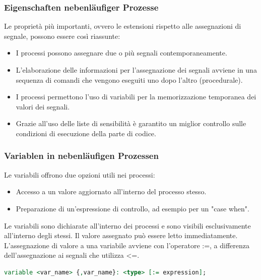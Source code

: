         \subsubsection{Eigenschaften nebenläufiger Prozesse}
        Le proprietà più importanti, ovvero le estensioni rispetto alle assegnazioni di segnale, possono essere così riassunte:
            \begin{itemize}
                \item I processi possono assegnare due o più segnali contemporaneamente.
                \item L'elaborazione delle informazioni per l'assegnazione dei segnali avviene in una sequenza di comandi che vengono eseguiti uno dopo l'altro (procedurale).
                \item I processi permettono l'uso di variabili per la memorizzazione temporanea dei valori dei segnali.
                \item Grazie all'uso delle liste di sensibilità è garantito un miglior controllo sulle condizioni di esecuzione della parte di codice.
            \end{itemize}
    
        \subsubsection{Variablen in nebenläufigen Prozessen}
        Le variabili offrono due opzioni utili nei processi:
            \begin{itemize}
                \item Accesso a un valore aggiornato all'interno del processo stesso.
                \item Preparazione di un'espressione di controllo, ad esempio per un "case when".
            \end{itemize}
            Le variabili sono dichiarate all'interno dei processi e sono visibili esclusivamente all'interno degli stessi.
            Il valore assegnato può essere letto immediatamente.\\
            L'assegnazione di valore a una variabile avviene con l'operatore :=, a differenza dell'assegnazione ai segnali che utilizza <=.
        \begin{lstlisting}[language=VHDL]
variable <var_name> {,var_name}: <type> [:= expression];
        \end{lstlisting}